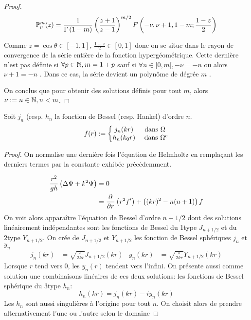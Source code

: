 \begin{proof}
{\[
\mathbb{P}^m_\nu(z) = \dfrac{1}{\Gamma\left(1-m\right)}\left(\dfrac{z+1}{z-1}\right)^{m/2}F\left(-\nu,\nu+1,1-m;\dfrac{1-z}{2}\right)
\]

Comme $z=\cos\theta \in [-1,1] $, $\frac{1-z}{2} \in [0,1]$ donc on se situe dans le rayon de convergence de la série entière de la fonction hypergéométrique. Cette dernière n'est pas définie si $\forall p\in \mathbb N, m=1+p $ sauf si $\forall n \in [0,m[, -\nu = -n $ ou alors $ \nu +1 = -n $ \cite[p.~556]{abramowitz_handbook_1964}. Dans ce cas, la série devient un polynôme de dégrée $m$ \cite[p.~561]{abramowitz_handbook_1964}.

On conclus que pour obtenir des solutions définis pour tout $m$, alors $\nu:=n \in \mathbb N, n< m $.
}


\end{proof}


\begin{prop} Soit $j_n$ (resp. $h_n$ la fonction de Bessel (resp. Hankel) d'ordre $n$.
  \begin{equation}
    f(r) := \left\lbrace
    \begin{matrix}
    j_n(kr) & \text{ dans $\Omega$ } \\
    h_n(k_0r) & \text{ dans } \Omega^c \\
    \end{matrix}\right.
  \end{equation}
\end{prop}
\begin{proof}
On normalise une dernière fois l'équation de Helmholtz en remplaçant les derniers termes par la constante exhibée précédemment.

\begin{align*}
\dfrac{r^2}{gh} \left(\Delta \Psi + k^2 \Psi\right) &= 0 \\
&= \dfrac{\partial^{{}} }{{\partial r}^{{}}}\left(r^2f'\right) + \left((kr)^2 - n(n+1)\right)f
\end{align*}
  On voit alors apparaître l'équation de Bessel d'ordre $n +1/2$ dont des solutions linéairement indépendantes sont les fonctions de Bessel du 1\ier type $J_{n+1/2}$ et du 2\ieme type $Y_{n+1/2}$\cite[p.~86]{bohren_absorption_2004}\cite[p.~1465]{morse_methods_1953}. 
  On crée de $J_{n+1/2}$ et $Y_{n+1/2}$ les fonction de Bessel sphériques $j_n$ et $y_n$ 
  \begin{align*}
  j_n(kr) &= \sqrt{\frac{\pi}{2kr}}J_{n+1/2}(kr) &
  y_n(kr) &= \sqrt{\frac{\pi}{2kr}}Y_{n+1/2}(kr)
  \end{align*}
  Lorsque $r$ tend vers $0$, les $y_n(r)$ tendent vers l'infini. On présente aussi comme solution une combinaisons linéaires de ces deux solutions: les fonctions de Bessel sphérique du 3\ieme type $h_n$:
  \[
  h_n(kr)=j_n(kr)-i y_n(kr)
  \]
  Les $h_n$ sont aussi singulières à l'origine pour tout $n$. On choisit alors de prendre alternativement l'une ou l'autre selon le domaine
  \end{proof}


